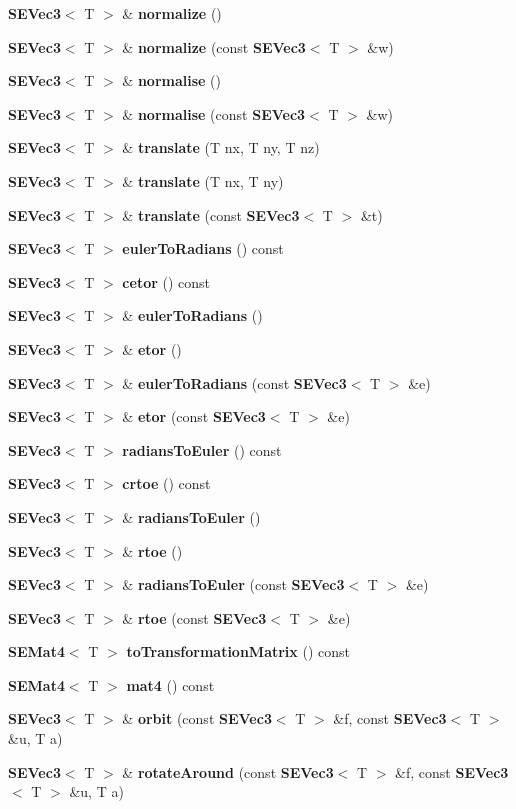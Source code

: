 \begin{DoxyCompactItemize}
\item 
{\bf S\+E\+Vec3}$<$ T $>$ \& {\bf normalize} ()
\item 
{\bf S\+E\+Vec3}$<$ T $>$ \& {\bf normalize} (const {\bf S\+E\+Vec3}$<$ T $>$ \&w)
\item 
{\bf S\+E\+Vec3}$<$ T $>$ \& {\bf normalise} ()
\item 
{\bf S\+E\+Vec3}$<$ T $>$ \& {\bf normalise} (const {\bf S\+E\+Vec3}$<$ T $>$ \&w)
\item 
{\bf S\+E\+Vec3}$<$ T $>$ \& {\bf translate} (T nx, T ny, T nz)
\item 
{\bf S\+E\+Vec3}$<$ T $>$ \& {\bf translate} (T nx, T ny)
\item 
{\bf S\+E\+Vec3}$<$ T $>$ \& {\bf translate} (const {\bf S\+E\+Vec3}$<$ T $>$ \&t)
\item 
{\bf S\+E\+Vec3}$<$ T $>$ {\bf euler\+To\+Radians} () const 
\item 
{\bf S\+E\+Vec3}$<$ T $>$ {\bf cetor} () const 
\item 
{\bf S\+E\+Vec3}$<$ T $>$ \& {\bf euler\+To\+Radians} ()
\item 
{\bf S\+E\+Vec3}$<$ T $>$ \& {\bf etor} ()
\item 
{\bf S\+E\+Vec3}$<$ T $>$ \& {\bf euler\+To\+Radians} (const {\bf S\+E\+Vec3}$<$ T $>$ \&e)
\item 
{\bf S\+E\+Vec3}$<$ T $>$ \& {\bf etor} (const {\bf S\+E\+Vec3}$<$ T $>$ \&e)
\item 
{\bf S\+E\+Vec3}$<$ T $>$ {\bf radians\+To\+Euler} () const 
\item 
{\bf S\+E\+Vec3}$<$ T $>$ {\bf crtoe} () const 
\item 
{\bf S\+E\+Vec3}$<$ T $>$ \& {\bf radians\+To\+Euler} ()
\item 
{\bf S\+E\+Vec3}$<$ T $>$ \& {\bf rtoe} ()
\item 
{\bf S\+E\+Vec3}$<$ T $>$ \& {\bf radians\+To\+Euler} (const {\bf S\+E\+Vec3}$<$ T $>$ \&e)
\item 
{\bf S\+E\+Vec3}$<$ T $>$ \& {\bf rtoe} (const {\bf S\+E\+Vec3}$<$ T $>$ \&e)
\item 
{\bf S\+E\+Mat4}$<$ T $>$ {\bf to\+Transformation\+Matrix} () const 
\item 
{\bf S\+E\+Mat4}$<$ T $>$ {\bf mat4} () const 
\item 
{\bf S\+E\+Vec3}$<$ T $>$ \& {\bf orbit} (const {\bf S\+E\+Vec3}$<$ T $>$ \&f, const {\bf S\+E\+Vec3}$<$ T $>$ \&u, T a)
\item 
{\bf S\+E\+Vec3}$<$ T $>$ \& {\bf rotate\+Around} (const {\bf S\+E\+Vec3}$<$ T $>$ \&f, const {\bf S\+E\+Vec3}$<$ T $>$ \&u, T a)

\end{DoxyCompactItemize}
